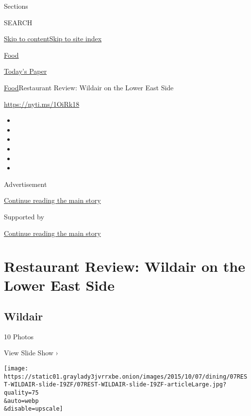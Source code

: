 Sections

SEARCH

\protect\hyperlink{site-content}{Skip to
content}\protect\hyperlink{site-index}{Skip to site index}

\href{https://www.nytimes3xbfgragh.onion/section/food}{Food}

\href{https://myaccount.nytimes3xbfgragh.onion/auth/login?response_type=cookie\&client_id=vi}{}

\href{https://www.nytimes3xbfgragh.onion/section/todayspaper}{Today's
Paper}

\href{/section/food}{Food}\textbar{}Restaurant Review: Wildair on the
Lower East Side

\url{https://nyti.ms/1OiRk18}

\begin{itemize}
\item
\item
\item
\item
\item
\item
\end{itemize}

Advertisement

\protect\hyperlink{after-top}{Continue reading the main story}

Supported by

\protect\hyperlink{after-sponsor}{Continue reading the main story}

\hypertarget{restaurant-review-wildair-on-the-lower-east-side}{%
\section{Restaurant Review: Wildair on the Lower East
Side}\label{restaurant-review-wildair-on-the-lower-east-side}}

\href{https://www.nytimes3xbfgragh.onion/slideshow/2015/10/07/dining/wildair.html}{}

\hypertarget{wildair}{%
\subsection{Wildair}\label{wildair}}

10 Photos

View Slide Show ›

\texttt{[image: https://static01.graylady3jvrrxbe.onion/images/2015/10/07/dining/07REST-WILDAIR-slide-I9ZF/07REST-WILDAIR-slide-I9ZF-articleLarge.jpg?quality=75\\\&auto=webp\\\&disable=upscale]}

